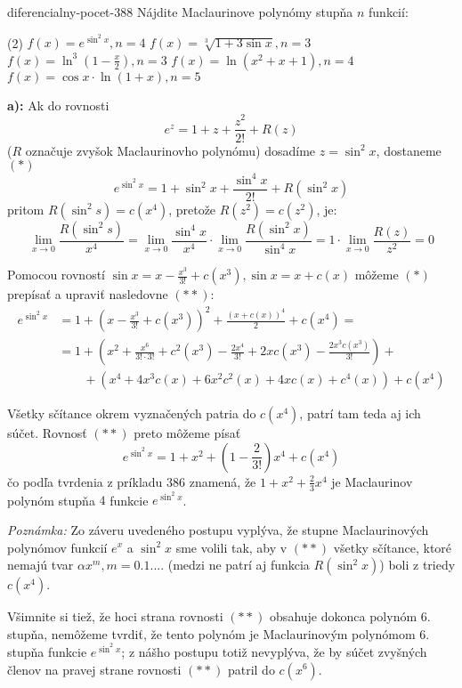 \begin{defproblem}{diferencialny-pocet-388}
Nájdite Maclaurinove polynómy stupňa $n$ funkcií:
\begin{tasks}(2)
  \task $f(x)=e^{\sin^2 x},n=4$
  \task $f(x)=\sqrt[3]{1+3\sin x},n=3$
  \task $f(x)=\ln^3 (1-\frac{x}{2}),n=3$
  \task $f(x)=\ln (x^2+x+1),n=4$
  \task $f(x)=\cos x\cdot\ln (1+x),n=5$
\end{tasks}

\begin{solution}
  \textbf{a):}
  Ak do rovnosti
  \[
    e^z=1+z+\frac{z^2}{2!}+R(z)
  \]
  ($R$ označuje zvyšok Maclaurinovho polynómu) dosadíme $z=\sin^2 x$, dostaneme
  $(*)$
  \[
    e^{\sin^2 x}=1+\sin^2 x+\frac{\sin^4 x}{2!}+R(\sin^2 x)
  \]
  pritom $R(\sin^2 s)=c(x^4)$, pretože $R(z^2)=c(z^2)$, je:
  \[
    \lim\limits_{x\rightarrow 0}\frac{R(\sin^2 s)}{x^4}
      = \lim\limits_{x \rightarrow 0}
          \frac{\sin^4 x}{x^4}
        \cdot
        \lim\limits_{x \rightarrow 0}\frac{R(\sin^2 x)}{\sin^4x}
      = 1 \cdot \lim\limits_{x \rightarrow 0}\frac{R(z)}{z^2}=0
  \]

  Pomocou rovností $\sin x=x-\frac{x^3}{3!}+c(x^3),\sin x=x+c(x)$ môžeme $(*)$
  prepísať a upraviť nasledovne $(**)$:
  \begin{align*}
    e^{\sin^2 x}
      &= 1 + (x-\frac{x^3}{3!}+c(x^3))^2+\frac{(x+c(x))^4}{2}+c(x^4) = \\
      &= 1 + (x^2+\frac{x^6}{3!\cdot 3!}+c^2 (x^3)-\frac{2x^4}{3!}+2xc(x^3)
        - \frac{2x^3c(x^3)}{3!}) + \\
        & \qquad + (x^4+4x^3c(x)+6x^2c^2(x)+4xc(x)+c^4(x))+c(x^4)
  \end{align*}

  Všetky sčítance okrem vyznačených patria do $c(x^4)$, patrí tam teda aj ich
  súčet. Rovnosť $(**)$ preto môžeme písať
  \[
    e^{\sin^2 x}=1+x^2+(1-\frac{2}{3!})x^4+c(x^4)
  \]
  čo podľa tvrdenia z príkladu $386$ znamená, že $1+x^2+\frac{2}{3}x^4$ je
  Maclaurinov polynóm stupňa $4$ funkcie $e^{\sin^2 x}$.

  \textit{Poznámka:}
  Zo záveru uvedeného postupu vyplýva, že stupne Maclaurinových polynómov
  funkcií $e^x$ a $\sin^2 x$ sme volili tak, aby v $(**)$ všetky sčítance, ktoré
  nemajú tvar $\alpha x^m,m=0.1....$ (medzi ne patrí aj funkcia $R(\sin^2 x)$)
  boli z triedy $c(x^4)$.

  Všimnite si tiež, že hoci strana rovnosti $(**)$ obsahuje dokonca polynóm $6.$
  stupňa, nemôžeme tvrdiť, že tento polynóm je Maclaurinovým polynómom $6.$
  stupňa funkcie $e^{\sin^2 x}$; z nášho postupu totiž nevyplýva, že by súčet
  zvyšných členov na pravej strane rovnosti $(**)$ patril do $c(x^6)$.
\end{solution}
\end{defproblem}

